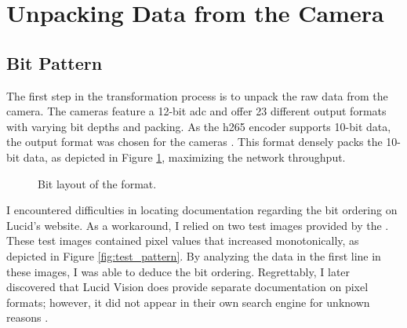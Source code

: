 \section {Unpacking Data from the Camera}
\subsection{Bit Pattern}
\label{sec:unpacking}
The first step in the transformation process is to unpack the raw data from the camera.
The \lucid cameras feature a 12-bit \gls{adc} and offer 23 different output formats with varying bit depths and packing.
As the \gls{h265} encoder supports 10-bit data, the  output format was chosen for the cameras \cite[17 ]{nvidiaNVIDIAJetsonAGX2019}.
This format densely packs the 10-bit data, as depicted in Figure \ref{fig:mono10p}, maximizing the network throughput.

\begin{figure}[H]
    \centering
    \caption{Bit layout of the  format.}
    \label{fig:mono10p}
\end{figure}

I encountered difficulties in locating documentation regarding the bit ordering on Lucid's website.
As a workaround, I relied on two test images provided by the \cam.
These test images contained pixel values that increased monotonically, as depicted in Figure \ref{fig:test_pattern}.
By analyzing the data in the first line in these images, I was able to deduce the bit ordering.
Regrettably, I later discovered that Lucid Vision does provide separate documentation on pixel formats; however, it did not appear in their own search engine for unknown reasons \cite{lucidvisionlabsPixelFormatsLUCID2020}.

